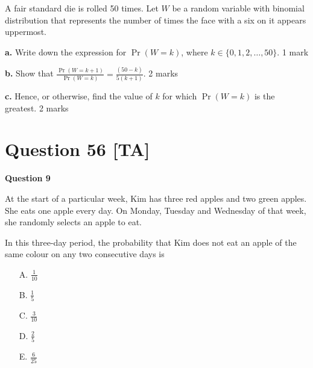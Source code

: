 \documentclass[10pt,a4paper]{article}
\begin{document}
A fair standard die is rolled 50 times. Let $W$ be a random variable with binomial distribution that represents the number of times the face with a six on it appears uppermost.

\textbf{a.} Write down the expression for $\Pr(W = k)$, where $k \in \{0, 1, 2, \ldots, 50\}$. \hfill 1 mark

\vspace{9\baselineskip}

\textbf{b.} Show that $\frac{\Pr(W = k+1)}{\Pr(W = k)} = \frac{(50-k)}{5(k+1)}$. \hfill 2 marks

\vspace{9\baselineskip}

\textbf{c.} Hence, or otherwise, find the value of $k$ for which $\Pr(W = k)$ is the greatest. \hfill 2 marks

\vspace{9\baselineskip}

\hrulefill

\section*{Question 56 [TA]}

\textbf{Question 9}

At the start of a particular week, Kim has three red apples and two green apples. She eats one apple every day. On Monday, Tuesday and Wednesday of that week, she randomly selects an apple to eat.

In this three-day period, the probability that Kim does not eat an apple of the same colour on any two consecutive days is

\begin{enumerate}
    \item[A.] $\frac{1}{10}$
    \item[B.] $\frac{1}{5}$
    \item[C.] $\frac{3}{10}$
    \item[D.] $\frac{2}{5}$
    \item[E.] $\frac{6}{25}$
\end{enumerate}

\vspace{9\baselineskip}
\end{document}
